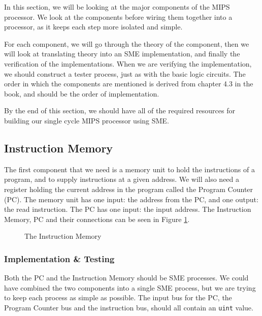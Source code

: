 In this section, we will be looking at the major components of the MIPS
processor. We look at the components before wiring them together into a
processor, as it keeps each step more isolated and simple.

For each component, we will go through the theory of the component, then we
will look at translating theory into an SME implementation, and finally the
verification of the implementations. When we are verifying the implementation,
we should construct a tester process, just as with the basic logic circuits.
The order in which the components are mentioned is derived from chapter 4.3 in
the book\cite{ref:ark}, and should be the order of implementation.

By the end of this section, we should have all of the required resources for
building our single cycle MIPS processor using SME.

\subsection{Instruction Memory}
The first component that we need is a memory unit to hold the instructions of a
program, and to supply instructions at a given address. We will also need a
register holding the current address in the program called the Program Counter
(PC). The memory unit has one input: the address from the PC, and one output:
the read instruction. The PC has one input: the input address. The Instruction
Memory, PC and their connections can be seen in Figure \ref{fig:inst}.
\begin{figure}
    \centering
    \caption{The Instruction Memory}
    \label{fig:inst}
\end{figure}

\subsubsection*{Implementation \& Testing}
Both the PC and the Instruction Memory should be SME processes. We could have
combined the two components into a single SME process, but we are trying to
keep each process as simple as possible. The input bus for the PC, the Program
Counter bus and the instruction bus, should all contain an \texttt{uint} value.


